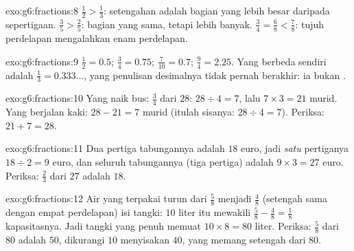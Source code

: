 \begin{solution}{exo:g6:fractions:8}
$\frac12 > \frac13$: setengahan adalah bagian yang lebih besar daripada sepertigaan.
$\frac35 > \frac25$: bagian yang sama, tetapi lebih banyak.
$\frac34 = \frac68 < \frac78$: tujuh perdelapan mengalahkan enam perdelapan.
\end{solution}

\begin{solution}{exo:g6:fractions:9}
$\frac12 = 0.5$; \quad $\frac34 = 0.75$; \quad
$\frac{7}{10} = 0.7$; \quad $\frac94 = 2.25$. Yang berbeda sendiri
adalah $\frac13 = 0.333\dots$, yang penulisan desimalnya tidak pernah
berakhir: ia bukan .
\end{solution}

\begin{solution}{exo:g6:fractions:10}
Yang naik bus: $\frac34$ dari $28$: $28 \div 4 = 7$, lalu
$7 \times 3 = 21$ murid. Yang berjalan kaki: $28 - 21 = 7$ murid
(itulah  sisanya: $28 \div 4 = 7$). Periksa: $21 + 7 = 28$.
\end{solution}

\begin{solution}{exo:g6:fractions:11}
Dua pertiga tabungannya adalah $18$ euro, jadi \emph{satu} pertiganya
$18 \div 2 = 9$ euro, dan seluruh tabungannya (tiga pertiga) adalah
$9 \times 3 = 27$ euro. Periksa: $\frac23$ dari $27$ adalah $18$.
\end{solution}

\begin{solution}{exo:g6:fractions:12}
Air yang terpakai turun dari $\frac58$ menjadi $\frac48$ (setengah
sama dengan empat perdelapan) isi tangki: $10$ liter itu mewakili
$\frac58 - \frac48 = \frac18$ kapasitasnya. Jadi tangki yang penuh
memuat $10 \times 8 = 80$ liter. Periksa: $\frac58$ dari $80$ adalah
$50$, dikurangi $10$ menyisakan $40$, yang memang setengah dari $80$.
\end{solution}

